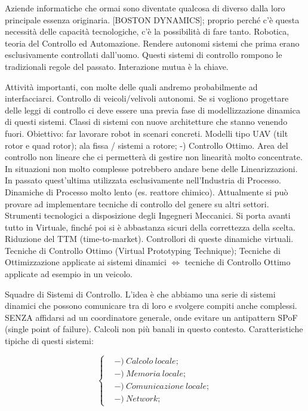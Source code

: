 Aziende informatiche che ormai sono diventate qualcosa di diverso dalla loro principale essenza originaria. [BOSTON DYNAMICS]; proprio perché c'è questa necessità delle capacità tecnologiche, c'è la possibilità di fare tanto. Robotica, teoria del Controllo ed Automazione. Rendere autonomi sistemi che prima erano esclusivamente controllati dall'uomo. Questi sistemi di controllo rompono le tradizionali regole del passato. Interazione mutua è la chiave.

Attività importanti, con molte delle quali andremo probabilmente ad interfacciarci. Controllo di veicoli/velivoli autonomi. Se si vogliono progettare delle leggi di controllo ci deve essere una previa fase di modellizzazione dinamica di questi sistemi. Classi di sistemi con nuove architetture che stanno venendo fuori. Obiettivo: far lavorare robot in scenari concreti. Modelli tipo UAV (tilt rotor e quad rotor); ala fissa / sistemi a rotore; -) Controllo Ottimo. Area del controllo non lineare che ci permetterà di gestire non linearità molto concentrate. In situazioni non molto complesse potrebbero andare bene delle Linearizzazioni. In passato quest'ultima utilizzata esclusivamente nell'Industria di Processo. Dinamiche di Processo molto lento (es. reattore chimico). Attualmente si può provare ad implementare tecniche di controllo del genere su altri settori. Strumenti tecnologici a disposizione degli Ingegneri Meccanici. Si porta avanti tutto in Virtuale, finché poi si è abbastanza sicuri della correttezza della scelta.  Riduzione del TTM (time-to-market). Controllori di queste dinamiche virtuali. Tecniche di Controllo Ottimo (Virtual Prototyping Technique); Tecniche di Ottimizzazione applicate ai sistemi dinamici $\iff$ tecniche di Controllo Ottimo applicate ad esempio in un veicolo.

Squadre di Sistemi di Controllo. L'idea è che abbiamo una serie di sistemi dinamici che possono comunicare tra di loro e svolgere compiti anche complessi. SENZA affidarsi ad un coordinatore generale, onde evitare un antipattern SPoF (single point of failure). Calcoli non più banali in questo contesto. Caratteristiche tipiche di questi sistemi:

\begin{equation}
\left\{
\begin{aligned}
& -)\ Calcolo\ locale; \\
& -)\ Memoria\ locale; \\
& -)\ Comunicazione\ locale; \\
& -)\ Network;
\end{aligned} 
\right.
\end{equation}

